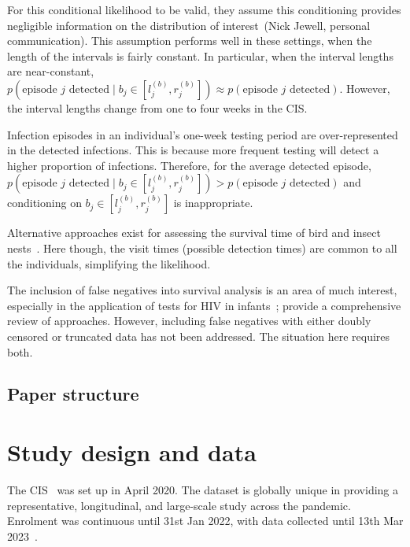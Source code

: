 \documentclass[12pt]{article}
\newcommand\citePersonalComms[1]{(#1, personal communication)}
\begin{document}
For this conditional likelihood to be valid, they assume this conditioning provides negligible information on the distribution of interest~\citePersonalComms{Nick Jewell}.
This assumption performs well in these settings, when the length of the intervals is fairly constant.
In particular, when the interval lengths are near-constant, $p(\text{episode $j$ detected} \mid b_j \in [l_j^{(b)}, r_j^{(b)}]) \approx p(\text{episode $j$ detected})$.
However, the interval lengths change from one to four weeks in the CIS.

Infection episodes in an individual's one-week testing period are over-represented in the detected infections.
This is because more frequent testing will detect a higher proportion of infections.
Therefore, for the average detected episode, $p(\text{episode $j$ detected} \mid b_j \in [l_j^{(b)}, r_j^{(b)}]) > p(\text{episode $j$ detected})$ and conditioning on $b_j \in [l_j^{(b)}, r_j^{(b)}]$ is inappropriate.

Alternative approaches exist for assessing the survival time of bird and insect nests~\citep{heiseyABCs,heiseyModelling}.
Here though, the visit times (possible detection times) are common to all the individuals, simplifying the likelihood.

The inclusion of false negatives into survival analysis is an area of much interest, especially in the application of tests for HIV in infants~\citep[e.g.][]{brownBayesian,balasubramanianEstimation};
\citet{piresIntervalMisclassify} provide a comprehensive review of approaches.
However, including false negatives with either doubly censored or truncated data has not been addressed.
The situation here requires both.

\subsection{Paper structure}



\section{Study design and data} \label{sec:data}

The CIS~\citep{CIS} was set up in April 2020.
The dataset is globally unique in providing a representative, longitudinal, and large-scale study across the pandemic.
Enrolment was continuous until 31st Jan 2022, with data collected until 13th Mar 2023~\citep{weiRisk}. 
\end{document}
